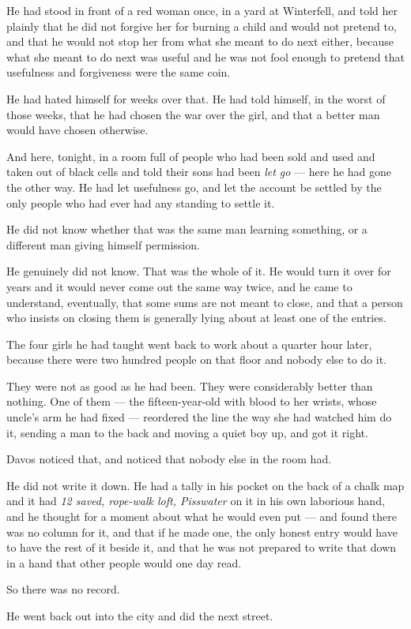 He had stood in front of a red woman once, in a yard at Winterfell, and told her plainly that he did not forgive her for burning a child and would not pretend to, and that he would not stop her from what she meant to do next either, because what she meant to do next was useful and he was not fool enough to pretend that usefulness and forgiveness were the same coin.

He had hated himself for weeks over that. He had told himself, in the worst of those weeks, that he had chosen the war over the girl, and that a better man would have chosen otherwise.

And here, tonight, in a room full of people who had been sold and used and taken out of black cells and told their sons had been \textit{let go} — here he had gone the other way. He had let usefulness go, and let the account be settled by the only people who had ever had any standing to settle it.

He did not know whether that was the same man learning something, or a different man giving himself permission.

He genuinely did not know. That was the whole of it. He would turn it over for years and it would never come out the same way twice, and he came to understand, eventually, that some sums are not meant to close, and that a person who insists on closing them is generally lying about at least one of the entries.

\sceneBreak

The four girls he had taught went back to work about a quarter hour later, because there were two hundred people on that floor and nobody else to do it.

They were not as good as he had been. They were considerably better than nothing. One of them — the fifteen-year-old with blood to her wrists, whose uncle’s arm he had fixed — reordered the line the way she had watched him do it, sending a man to the back and moving a quiet boy up, and got it right.

Davos noticed that, and noticed that nobody else in the room had.

He did not write it down. He had a tally in his pocket on the back of a chalk map and it had \textit{12 saved, rope-walk loft, Pisswater} on it in his own laborious hand, and he thought for a moment about what he would even put — and found there was no column for it, and that if he made one, the only honest entry would have to have the rest of it beside it, and that he was not prepared to write that down in a hand that other people would one day read.

So there was no record.

He went back out into the city and did the next street.